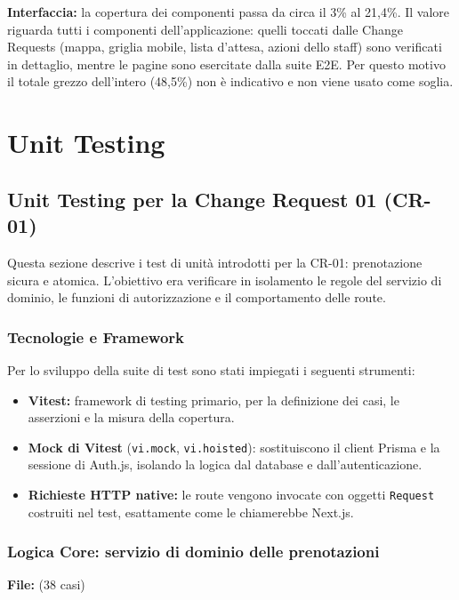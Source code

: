 \documentclass[11pt,a4paper,oneside,openany]{book}
\begin{document}
\textbf{Interfaccia:} la copertura dei componenti passa da circa il 3\% al
21,4\%. Il valore riguarda tutti i componenti dell'applicazione: quelli
toccati dalle Change Requests (mappa, griglia mobile, lista d'attesa, azioni
dello staff) sono verificati in dettaglio, mentre le pagine sono esercitate
dalla suite E2E. Per questo motivo il totale grezzo dell'intero 
(48,5\%) non è indicativo e non viene usato come soglia.

\chapter{Unit Testing}

\section{Unit Testing per la Change Request 01 (CR-01)}

Questa sezione descrive i test di unità introdotti per la CR-01: prenotazione
sicura e atomica. L'obiettivo era verificare in isolamento le regole del
servizio di dominio, le funzioni di autorizzazione e il comportamento delle
route.

\subsection{Tecnologie e Framework}

Per lo sviluppo della suite di test sono stati impiegati i seguenti strumenti:
\begin{itemize}
  \item \textbf{Vitest:} framework di testing primario, per la definizione dei
        casi, le asserzioni e la misura della copertura.
  \item \textbf{Mock di Vitest} (\texttt{vi.mock}, \texttt{vi.hoisted}):
        sostituiscono il client Prisma e la sessione di Auth.js, isolando la
        logica dal database e dall'autenticazione.
  \item \textbf{Richieste HTTP native:} le route vengono invocate con oggetti
        \texttt{Request} costruiti nel test, esattamente come le chiamerebbe
        Next.js.
\end{itemize}

\subsection{Logica Core: servizio di dominio delle prenotazioni}

\textbf{File:}  (38 casi)
\end{document}

